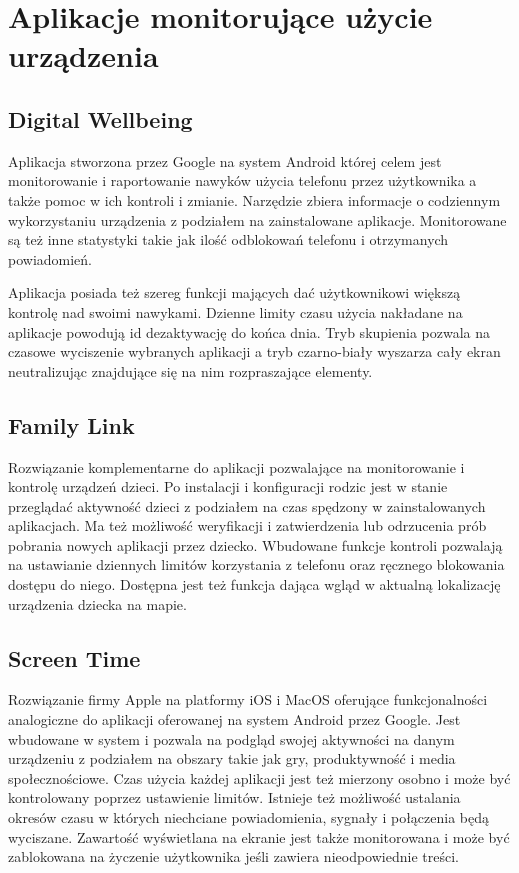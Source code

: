 \section{Aplikacje monitorujące użycie urządzenia}

\subsection{Digital Wellbeing}
\label{sec:digital_wellbeing}
Aplikacja stworzona przez Google na system Android której celem jest monitorowanie i raportowanie nawyków użycia telefonu przez użytkownika a także pomoc w ich kontroli i zmianie. Narzędzie zbiera informacje o codziennym wykorzystaniu urządzenia z podziałem na zainstalowane aplikacje. Monitorowane są też inne statystyki takie jak ilość odblokowań telefonu i otrzymanych powiadomień. 
\bigskip
{}

Aplikacja posiada też szereg funkcji mających dać użytkownikowi większą kontrolę nad swoimi nawykami. Dzienne limity czasu użycia nakładane na aplikacje powodują id dezaktywację do końca dnia. Tryb skupienia pozwala na czasowe wyciszenie wybranych aplikacji a tryb czarno-biały wyszarza cały ekran neutralizując znajdujące się na nim rozpraszające elementy.

\subsection{Family Link}
Rozwiązanie komplementarne do aplikacji  pozwalające na monitorowanie i kontrolę urządzeń dzieci. Po instalacji i konfiguracji rodzic jest w stanie przeglądać aktywność dzieci z podziałem na czas spędzony w zainstalowanych aplikacjach. Ma też możliwość weryfikacji i zatwierdzenia lub odrzucenia prób pobrania nowych aplikacji przez dziecko. Wbudowane funkcje kontroli pozwalają na ustawianie dziennych limitów korzystania z telefonu oraz ręcznego blokowania dostępu do niego. Dostępna jest też funkcja dająca wgląd w aktualną lokalizację urządzenia dziecka na mapie.

\subsection{Screen Time}
Rozwiązanie firmy Apple na platformy iOS i MacOS oferujące funkcjonalności analogiczne do aplikacji  oferowanej na system Android przez Google. Jest wbudowane w system i pozwala na podgląd swojej aktywności na danym urządzeniu z podziałem na obszary takie jak gry, produktywność i media społecznościowe. Czas użycia każdej aplikacji jest też mierzony osobno i może być kontrolowany poprzez ustawienie limitów. Istnieje też możliwość ustalania okresów czasu w których niechciane powiadomienia, sygnały i połączenia będą wyciszane. Zawartość wyświetlana na ekranie jest także monitorowana i może być zablokowana na życzenie użytkownika jeśli zawiera nieodpowiednie treści.

